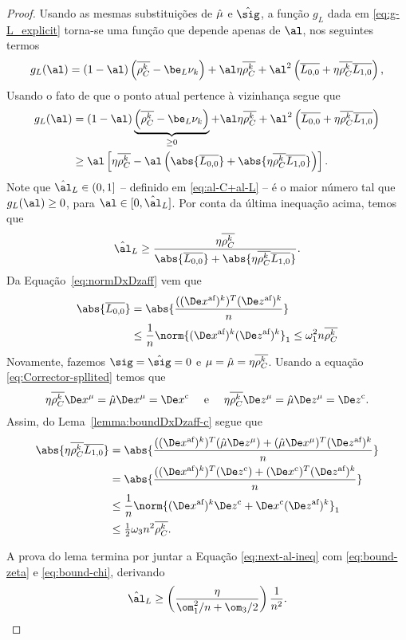 \begin{proof}

Usando as mesmas substituições de $\hat{\mu}$ e $\nextsig$, a função $g_L$ dada em \eqref{eq:g-L_explicit} torna-se uma função que depende apenas de $\al$, nos seguintes termos 
\[
g_L(\al) =     (1-\al)\left(\rhoCkb  -  \be_L \nuk    \right) +  \al\eta\rhoCkb  + 
   \al^2\left( \dbvec{L_{0,0}} + \eta\rhoCkb   \dbvec{L_{1,0}}   \right ) ,
	\]
Usando  o fato de que o ponto atual pertence à  vizinhança segue que 
 \[
\begin{aligned}
{g}_L(\al) & =     (1-\al)\underbrace{\left(\rhoCkb  -  \be_L \nuk    \right)}_{\geq 0} +  \al\eta\rhoCkb  + 
   \al^2\left( \dbvec{L_{0,0}} + \eta\rhoCkb   \dbvec{L_{1,0}}   \right ) \\
   & \geq  \al\left[\eta\rhoCkb  - 
   \al \left(\abs{\dbvec{L_{0,0}}} + \abs{\eta\rhoCkb   \dbvec{L_{1,0}}}\right)   \right ].
\end{aligned}
 \]
Note que  $\nextal_L\in(0,1]$ -- definido em \eqref{eq:al-C+al-L} -- é o maior número tal que  $g_L(\al)\geq 0$, para  $\al\in[0,\nextal_L]$. Por conta da última inequação acima, temos que 
\begin{equation}
	\label{eq:next-al-ineq}
\nextal_L \geq \frac{\eta\rhoCkb  }{\abs{\dbvec{L_{0,0}}} + \abs{\eta\rhoCkb   \dbvec{L_{1,0}}}}.
\end{equation}
Da Equação~\eqref{eq:normDxDzaff}  vem que  
\begin{align}
\abs{\dbvec{L_{0,0}}} &  = \abs{\dfrac{( \dekx )^T \dekz }{n}} \notag \\
			& \leq \dfrac{1}{n} \norm{ \dekx  \dekz }_1  \leq  \omega_1^{2} n\rhoCkb \label{eq:bound-zeta}
\end{align}
Novamente, fazemos $\sig = \nextsig=0$ e  $\mu=\hat{\mu} = \eta\overline{\rho_C^{k}} $. Usando a equação \eqref{eq:Corrector-spllited} temos que 
	\[
		\eta\rhoCkb \Dex^\mu =  \nextmu\Dex^\mu = \Decox   \quad \text{ e } \quad \eta\rhoCkb \Dez^\mu=  \nextmu\Dez^\mu=  \Decoz .
	\]
	Assim, do Lema~\ref{lemma:boundDxDzaff-c} segue que
	\begin{align}
	\abs{\eta\rhoCkb  \dbvec{L_{1,0}}} & = \abs{\dfrac{( \dekx )^T(\nextmu\Dez^\mu) + (\nextmu\Dex^\mu)^T \dekz }{n}   }  \notag \\ 
	&  = \abs{\dfrac{( \dekx )^T(\Decoz) + (\Decox)^T \dekz }{n} } \notag \\
	& \leq \dfrac{1}{n} \norm{ \dekx \Decoz + \Decox \dekz }_1 \notag\\
	&\leq \tfrac{1}{2}\omega_{3}n^{2}\rhoCkb .\label{eq:bound-chi}
	\end{align}

A prova do lema termina por juntar a Equação \eqref{eq:next-al-ineq} com \eqref{eq:bound-zeta} e \eqref{eq:bound-chi}, derivando 
\[
\nextal_L \geq \left( \frac{\eta }{\om_{1}^{2}/n + \om_{3}/2}\right)\dfrac{1}{n^{2}}. \qedhere
\]
\end{proof}


